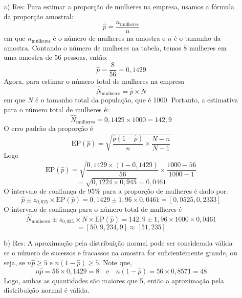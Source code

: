 \documentclass[a4paper,12pt,oneside,twocolumn]{Config/milktest}
\begin{document}
 {\tiny 
\begin{itemize}
    \item[a) Res:] 
    Para estimar a proporção de mulheres na empresa, usamos a fórmula da proporção amostral:
    \[
\hat{p} = \frac{n_{\text{mulheres}}}{n}
\] em que  \( n_{\text{mulheres}} \) é o número de mulheres na amostra e \( n \) é o tamanho da amostra. Contando o número de mulheres na tabela, temos 8 mulheres em uma amostra de 56 pessoas, então:
\[
\hat{p} = \frac{8}{56} = 0,1429
\]
Agora, para estimar o número total de mulheres na empresa \[
\hat{N}_{\text{mulheres}} = \hat{p} \times N
\]
em que \( N \) é o tamanho total da população, que é 1000. Portanto, a estimativa para o número total de mulheres é:
\[
\hat{N}_{\text{mulheres}} = 0,1429 \times 1000 = 142,9
\]
O erro padrão da proporção é
\[
\text{EP}(\hat{p}) = \sqrt{\frac{\hat{p}(1 - \hat{p})}{n} \times \frac{N - n}{N - 1}}
\]
Logo\[
\text{EP}(\hat{p}) = \sqrt{\frac{0,1429 \times (1 - 0,1429)}{56} \times \frac{1000 - 56}{1000 - 1}} \]
\[= \sqrt{0,1224 \times 0,945} = 0,0461
\]
O intervalo de confiança de 95\% para a proporção de mulheres é dado por:
\[
\hat{p} \pm z_{0,025} \times \text{EP}(\hat{p}) = 0,1429 \pm 1,96 \times 0,0461 = [0,0525, 0,2333]
\]
O intervalo de confiança para o número total de mulheres é \[
\hat{N}_{\text{mulheres}} \pm z_{0,025} \times N \times \text{EP}(\hat{p}) = 142,9 \pm 1,96 \times 1000 \times 0,0461 \]
\[= [50,9, 234,9] \approx [51, 235]
\]
\item[b) Res:]  A aproximação pela distribuição normal pode ser considerada válida se o número de sucessos e fracassos na amostra for suficientemente grande, ou seja, se \( n \hat{p} \geq 5 \) e \( n (1 - \hat{p}) \geq 5 \). Note que, \[
n \hat{p} = 56 \times 0,1429 = 8 \quad \text{e} \quad n (1 - \hat{p}) = 56 \times 0,8571 = 48
\]
Logo, ambas as quantidades são maiores que 5, então a aproximação pela distribuição normal é válida.


\end{itemize}}
\end{document}
